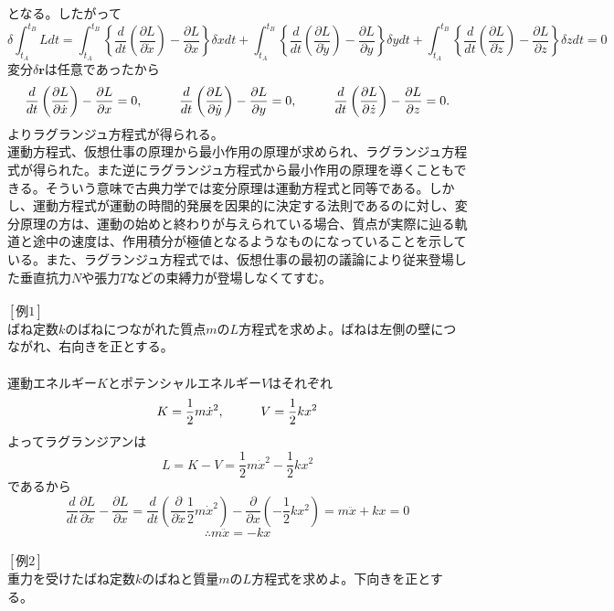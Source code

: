 \documentclass{jsarticle}
\begin{document}
となる。したがって
\[\delta\int_{t_{A}}^{t_{B}}Ldt=\int_{t_{A}}^{t_{B}}\left\{\frac{d}{dt}\left(\frac{\partial L}{\partial\dot{x}}\right)-\frac{\partial L}{\partial x}\right\}\delta xdt+\int_{t_{A}}^{t_{B}}\left\{\frac{d}{dt}\left(\frac{\partial L}{\partial\dot{y}}\right)-\frac{\partial L}{\partial y}\right\}\delta ydt+\int_{t_{A}}^{t_{B}}\left\{\frac{d}{dt}\left(\frac{\partial L}{\partial\dot{z}}\right)-\frac{\partial L}{\partial z}\right\}\delta zdt=0\]
変分\(\delta\bm{r}\)は任意であったから
\begin{equation}
\frac{d}{dt}\left(\frac{\partial L}{\partial\dot{x}}\right)-\frac{\partial L}{\partial x}=0,\hspace{10mm}\frac{d}{dt}\left(\frac{\partial L}{\partial\dot{y}}\right)-\frac{\partial L}{\partial y}=0,\hspace{10mm}\frac{d}{dt}\left(\frac{\partial L}{\partial\dot{z}}\right)-\frac{\partial L}{\partial z}=0.
\end{equation}
よりラグランジュ方程式が得られる。\\
運動方程式、仮想仕事の原理から最小作用の原理が求められ、ラグランジュ方程式が得られた。また逆にラグランジュ方程式から最小作用の原理を導くこともできる。そういう意味で古典力学では変分原理は運動方程式と同等である。しかし、運動方程式が運動の時間的発展を因果的に決定する法則であるのに対し、変分原理の方は、運動の始めと終わりが与えられている場合、質点が実際に辿る軌道と途中の速度は、作用積分が極値となるようなものになっていることを示している。また、ラグランジュ方程式では、仮想仕事の最初の議論により従来登場した垂直抗力\(N\)や張力\(T\)などの束縛力が登場しなくてすむ。\\
\\
\([例1]\)\\
ばね定数\(k\)のばねにつながれた質点\(m\)の\(L\)方程式を求めよ。ばねは左側の壁につながれ、右向きを正とする。\\
\\
運動エネルギー\(K\)とポテンシャルエネルギー\(V\)はそれぞれ
\[K=\frac{1}{2}m\dot{x}^{2},\hspace{10mm}V=\frac{1}{2}kx^{2}\]
よってラグランジアンは
\[L=K-V=\frac{1}{2}m\dot{x}^{2}-\frac{1}{2}kx^{2}\]
であるから
\[\frac{d}{dt}\frac{\partial L}{\partial\dot{x}}-\frac{\partial L}{\partial x}=\frac{d}{dt}\left(\frac{\partial}{\partial\dot{x}}\frac{1}{2}m\dot{x}^{2}\right)-\frac{\partial}{\partial x}\left(-\frac{1}{2}kx^{2}\right)=m\ddot{x}+kx=0\]
\[\therefore m\ddot{x}=-kx\]
\\
\([例2]\)\\
重力を受けたばね定数\(k\)のばねと質量\(m\)の\(L\)方程式を求めよ。下向きを正とする。\\
\end{document}
